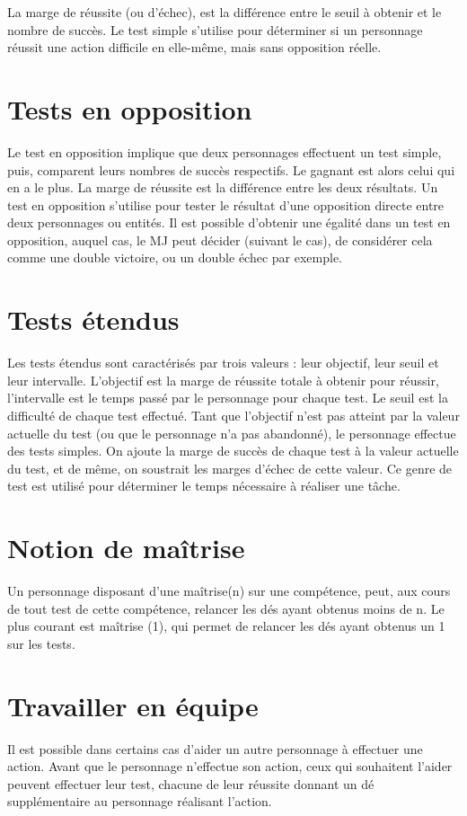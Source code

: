 \documentclass[10pt,a4paper,twocolumn]{book}
\begin{document}
La marge de réussite (ou d’échec), est la différence entre le seuil à obtenir et le nombre de succès.
Le test simple s’utilise pour déterminer si un personnage réussit une action difficile en elle-même, mais sans opposition réelle.
\section{Tests en opposition}
Le test en opposition implique que deux personnages effectuent un test simple, puis, comparent leurs nombres de succès respectifs. Le gagnant est alors celui qui en a le plus.
La marge de réussite est la différence entre les deux résultats.
Un test en opposition s’utilise pour tester le résultat d’une opposition directe entre deux personnages ou entités.
Il est possible d’obtenir une égalité dans un test en opposition, auquel cas, le MJ peut décider (suivant le cas), de considérer cela comme une double victoire, ou un double échec par exemple.
\section{Tests étendus}
Les tests étendus sont caractérisés par trois valeurs : leur objectif, leur seuil et leur intervalle.
L’objectif est la marge de réussite totale à obtenir pour réussir, l’intervalle est le temps passé par le personnage pour chaque test. Le seuil est la difficulté de chaque test effectué.
Tant que l’objectif n’est pas atteint par la valeur actuelle du test (ou que le personnage n’a pas abandonné), le personnage effectue des tests simples. On ajoute la marge de succès de chaque test à la valeur actuelle du test, et de même, on soustrait les marges d’échec de cette valeur. 
Ce genre de test est utilisé pour déterminer le temps nécessaire à réaliser une tâche.
\section{Notion de maîtrise}
Un personnage disposant d’une maîtrise(n) sur une compétence, peut, aux cours de tout test de cette compétence, relancer les dés ayant obtenus moins de n. Le plus courant est maîtrise (1), qui permet de relancer les dés ayant obtenus un 1 sur les tests.
\section{Travailler en équipe}
Il est possible dans certains cas d’aider un autre personnage à effectuer une action. Avant que le personnage n’effectue son action, ceux qui souhaitent l’aider peuvent effectuer leur test, chacune de leur réussite donnant un dé supplémentaire au personnage réalisant l’action.
\end{document}
